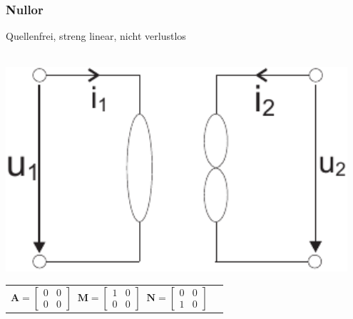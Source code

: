\documentclass[a4paper,twocolumn,10pt]{article}
\begin{document}
\subsubsection*{Nullor}
Quellenfrei, streng linear, nicht verlustlos\\\\
\begin{minipage}[b]{0.13\textwidth}
\includegraphics[width=0.95\textwidth]{Grafiken/OP_Nullor}
\end{minipage}
\hfill
\begin{minipage}[b]{0.33\textwidth}
\begin{tabular}{ll}
$\textbf{A}=\begin{bmatrix}0 & 0\\ 0 & 0\end{bmatrix}\;\;\textbf{M}=\begin{bmatrix}1 & 0\\ 0 & 0\end{bmatrix}\;\;\textbf{N}=\begin{bmatrix}0 & 0\\ 1 & 0\end{bmatrix}$
\end{tabular}\\
\end{minipage}
\end{document}
